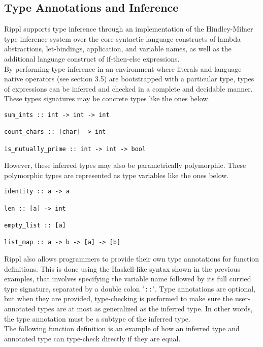 \documentclass[5pt]{article}
\begin{document}
\subsection{Type Annotations and Inference}
Rippl supports type inference through an implementation of the Hindley-Milner type inference system over the core syntactic language constructs of lambda abstractions, let-bindings, application, and variable names, as well as the additional language construct of if-then-else expressions. \\

\noindent By performing type inference in an environment where literals and language native operators (see section 3.5) are bootstrapped  with a particular type, types of expressions can be inferred and checked in a complete and decidable manner. These types signatures may be concrete types like the ones below.

\begin{lstlisting}[language=rippl]
sum_ints :: int -> int -> int

count_chars :: [char] -> int

is_mutually_prime :: int -> int -> bool
\end{lstlisting}

\noindent However, these inferred types may also be parametrically polymorphic. These polymorphic types are represented as type variables like the ones below. \\

\begin{lstlisting}[language=rippl]
identity :: a -> a

len :: [a] -> int

empty_list :: [a]

list_map :: a -> b -> [a] -> [b]
\end{lstlisting}

\noindent Rippl also allows programmers to provide their own type annotations for function definitions. This is done using the Haskell-like syntax shown in the previous examples, that involves specifying the variable name followed by its full curried type signature, separated by a double colon "\texttt{::}". Type annotations are optional, but when they are provided, type-checking is performed to make sure the user-annotated types are at most as generalized as the inferred type. In other words, the type annotation must be a subtype of the inferred type. \\

\noindent The following function definition is an example of how an inferred type and annotated type can type-check directly if they are equal. \\
\end{document}
